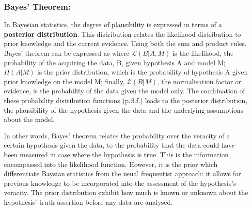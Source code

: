 \subsubsection{Bayes' Theorem:}
\qquad In Bayesian statistics, the degree of plausibility is expressed in terms of a \textbf{posterior distribution}. This distribution relates the likelihood distribution to prior knowledge and the current evidence. Using both the sum and product rules, Bayes' theorem can be expressed as
where $\mathcal{L}(B|A, M)$ is the likelihood, the probability of the acquiring the data, B, given hypothesis A and model M; $\Pi(A|M)$ is the prior distribution, which is the probability of hypothesis A given prior knowledge on the model M; finally, $\mathcal{Z}(B|M)$, the normalisation factor or evidence, is the probability of the data given the model only. The combination of these probability distribution functions (p.d.f.) leads to the posterior distribution, the plausibility of the hypothesis given the data and the underlying assumptions about the model. 

\qquad In other words, Bayes' theorem relates the probability over the veracity of a certain hypothesis given the data, to the probability that the data could have been measured in case where the hypothesis is true. This is the information encompassed into the likelihood function. However, it is the prior which differentiate Baysian statistics from the usual frequentist approach: it allows for previous knowledge to be incorporated into the assessment of the hypothesis's veracity. The prior distribution exhibit how much is known or unknown about the hypothesis' truth assertion before any data are analysed. 

